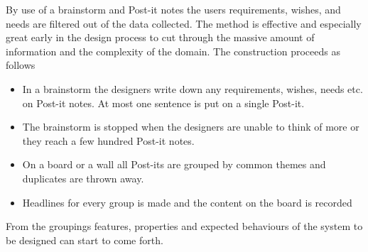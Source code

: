 \begin{method} \label{meth:affinity_diagram} 
  By use of a brainstorm and Post-it notes the users requirements, wishes, and needs are filtered out of the data collected. The method is effective and especially great early in the design process to cut through the massive amount of information and the complexity of the domain. The construction proceeds as follows
  \begin{itemize}
    \item In a brainstorm the designers write down any requirements, wishes, needs etc. on Post-it notes. At most one sentence is put on a single Post-it.
    \item The brainstorm is stopped when the designers are unable to think of more or they reach a few hundred Post-it notes.
    \item On a board or a wall all Post-its are grouped by common themes and duplicates are thrown away.
    \item Headlines for every group is made and the content on the board is recorded
  \end{itemize}
  From the groupings features, properties and expected behaviours of the system to be designed can start to come forth. \cite[p. 299-300]{benyon10}
\end{method}